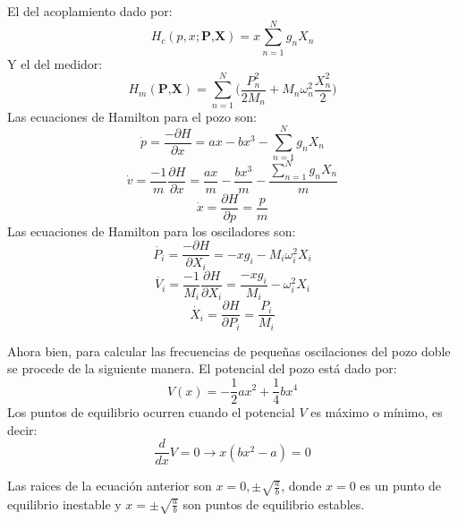 \documentclass[idxtotoc,hyperref,openany]{labbook} %
\begin{document}
El del acoplamiento dado por:
\begin{equation}
H_c(p,x;\textbf{P,X})=x\sum_{n=1}^N g_n X_n
\end{equation}
Y el del medidor:
\begin{equation}
H_m(\textbf{P,X})= \sum_{n=1}^N \Big(\frac{P_n^2}{2M_n}+M_n \omega_n^2\frac{X_n^2}{2} \Big)
\end{equation}
Las ecuaciones de Hamilton para el pozo son:
\begin{equation}
\dot{p}=\frac{-\partial H}{\partial x}=ax-bx^3-\sum_{n=1}^N g_n X_n
\end{equation}
\begin{equation}
\dot{v}=\frac{-1}{m}\frac{\partial H}{\partial x}=\frac{ax}{m}-\frac{bx^3}{m}-\frac{\sum_{n=1}^N g_n X_n}{m}
\end{equation}
\begin{equation}
\dot{x}=\frac{\partial H}{\partial p}=\frac{p}{m}
\end{equation}
Las ecuaciones de Hamilton para los osciladores son:
\begin{equation}
\dot{P_i}=\frac{-\partial H}{\partial X_i}=-xg_i-M_i \omega _i ^2 X_i
\end{equation}
\begin{equation}
\dot{V_i}=\frac{-1}{M_i}\frac{\partial H}{\partial X_i}=\frac{-xg_i}{M_i}-\omega _i^2 X_i
\end{equation}
\begin{equation}
\dot{X_i}=\frac{\partial H}{\partial P_i}=\frac{P_i}{M_i}
\end{equation}

Ahora bien, para calcular las frecuencias de pequeñas oscilaciones del pozo doble se procede de la siguiente manera. El potencial del pozo está dado por:
\begin{equation}
V(x)=-\frac{1}{2}ax^2+\frac{1}{4}bx^4
\end{equation}
Los puntos de equilibrio ocurren cuando el potencial $V$ es máximo o mínimo, es decir:
\begin{equation}
\frac{d}{dx}V=0\rightarrow x(bx^2-a) = 0
\end{equation}

Las raices de la ecuación anterior son $x=0,\pm \sqrt{\frac{a}{b}}$, donde $x=0$ es un punto de equilibrio inestable y $x=\pm \sqrt{\frac{a}{b}}$ son puntos de equilibrio estables.
\end{document}
